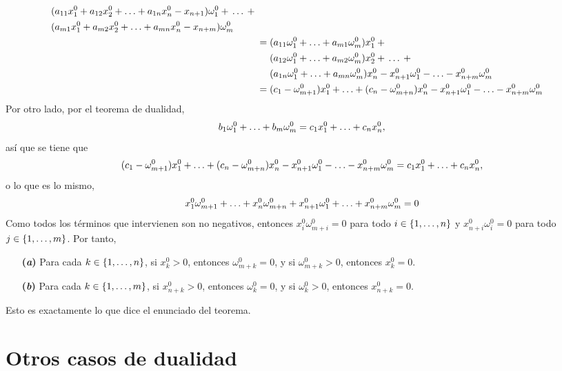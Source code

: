 \documentclass[11pt]{report}
\makeatletter
\renewenvironment{proof}[1][\proofname]{\par
  \pushQED{\qed}%
  \normalfont \topsep\z@skip %
  \trivlist
  \item[\hskip\labelsep
        \itshape
    #1\@addpunct{.}]\ignorespaces
}{%
  \popQED\endtrivlist\@endpefalse
}
\theoremstyle{mytheorem}
\theoremstyle{mydefinition}
\theoremstyle{myexample}
\let\oldproofname=\proofname
\renewcommand{\proofname}{\rm\bf{\oldproofname}}}
\makeatother
\begin{document}
\begin{proof}
\[\begin{aligned}[t]
\begin{aligned}[t]
&(a_{11}x^0_1+a_{12}x_2^0+\mathellipsis+a_{1n}x_n^0-x_{n+1})\omega^0_1 {}+{} \mathellipsis {}+{} \\
&(a_{m1}x^0_1+a_{m2}x_2^0+\mathellipsis+a_{mn}x_n^0-x_{n+m})\omega^0_m
\end{aligned} \\
&= \begin{aligned}[t]
&(a_{11}\omega^0_1+\mathellipsis+a_{m1}\omega^0_m)x_1^0 {}+{} \\
&(a_{12}\omega^0_1+\mathellipsis+a_{m2}\omega^0_m)x_2^0 {}+{} \mathellipsis {}+{} \\
&(a_{1n}\omega^0_1+\mathellipsis+a_{mn}\omega^0_m)x_n^0 {}-{} x_{n+1}^0\omega^0_1-\mathellipsis-x^0_{n+m}\omega_m^0
\end{aligned} \\
&= (c_1-\omega^0_{m+1})x_1^0+\mathellipsis+ (c_n-\omega^0_{m+n})x_n^0 - x_{n+1}^0\omega^0_1-\mathellipsis-x^0_{n+m}\omega_m^0 \\
\end{aligned}\]
Por otro lado, por el teorema de dualidad,
\[b_1\omega_1^0+\mathellipsis+b_m\omega^0_m = c_1x_1^0+\mathellipsis+c_nx_n^0,\]
así que se tiene que
\[(c_1-\omega^0_{m+1})x_1^0+\mathellipsis+ (c_n-\omega^0_{m+n})x_n^0 - x_{n+1}^0\omega^0_1-\mathellipsis-x^0_{n+m}\omega_m^0 = c_1x_1^0+\mathellipsis+c_nx_n^0,\]
o lo que es lo mismo,
\[x_1^0\omega^0_{m+1}+\mathellipsis+x_n^0\omega^0_{m+n}+x_{n+1}^0\omega_1^0+\mathellipsis+x_{n+m}^0\omega^0_m = 0\]
Como todos los términos que intervienen son no negativos, entonces $x^0_i\omega^0_{m+i} = 0$ para todo $i \in \{1,\mathellipsis,n\}$ y $x^0_{n+i}\omega_i^0 = 0$ para todo $j \in \{1,\mathellipsis,m\}$. Por tanto,
\begin{itemize}
    \item[\textbf{(\textit{a})}] Para cada $k \in \{1,\mathellipsis,n\}$, si $x^0_k >0$, entonces $\omega^0_{m+k} =0$, y si $\omega^0_{m+k} > 0$, entonces $x^0_{k} = 0$.
    \item[\textbf{(\textit{b})}] Para cada $k \in \{1,\mathellipsis,m\}$, si $x^0_{n+k} >0$, entonces $\omega^0_{k} =0$, y si $\omega^0_{k} > 0$, entonces $x^0_{n+k} = 0$.
\end{itemize}
Esto es exactamente lo que dice el enunciado del teorema.
\end{proof}

\section{Otros casos de dualidad}
\end{document}
